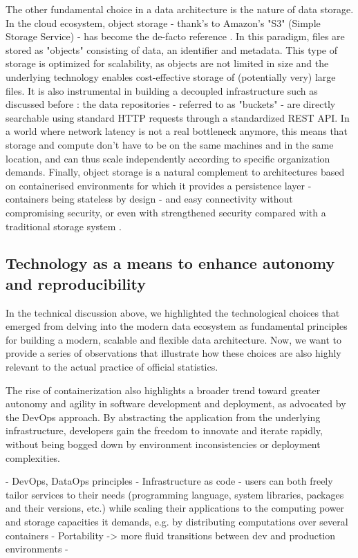 
The other fundamental choice in a data architecture is the nature of data storage. In the cloud ecosystem, object storage - thank's to Amazon's "S3" (Simple Storage Service) - has become the de-facto reference \cite{samundiswary2017object}. In this paradigm, files are stored as "objects" consisting of data, an identifier and metadata. This type of storage is optimized for scalability, as objects are not limited in size and the underlying technology enables cost-effective storage of (potentially very) large files. It is also instrumental in building a decoupled infrastructure such as discussed before : the data repositories - referred to as "buckets" - are directly searchable using standard HTTP requests through a standardized REST API. In a world where network latency is not a real bottleneck anymore, this means that storage and compute don't have to be on the same machines and in the same location, and can thus scale independently according to specific organization demands. Finally, object storage is a natural complement to architectures based on containerised environments for which it provides a persistence layer - containers being stateless by design - and easy connectivity without compromising security, or even with strengthened security compared with a traditional storage system \cite{mesnier2003object}.

\subsection{Technology as a means to enhance autonomy and reproducibility}

In the technical discussion above, we highlighted the technological choices that emerged from delving into the modern data ecosystem as fundamental principles for building a modern, scalable and flexible data architecture. Now, we want to provide a series of observations that illustrate how these choices are also highly relevant to the actual practice of official statistics.

The rise of containerization also highlights a broader trend toward greater autonomy and agility in software development and deployment, as advocated by the DevOps approach. By abstracting the application from the underlying infrastructure, developers gain the freedom to innovate and iterate rapidly, without being bogged down by environment inconsistencies or deployment complexities. 

- DevOps, DataOps principles
- Infrastructure as code
- users can both freely tailor services to their needs (programming language, system libraries, packages and their versions, etc.) while scaling their applications to the computing power and storage capacities it demands, e.g. by distributing computations over several containers
- Portability -> more fluid transitions between dev and production environments
- 

